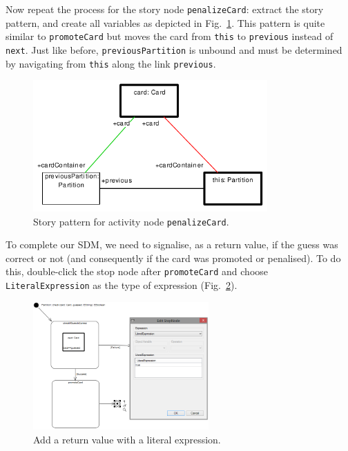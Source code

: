 Now repeat the process for the story node \texttt{penalizeCard}: extract the
story pattern, and create all variables as depicted in
Fig.~\ref{fig:sdm_check_complete_penalize}.  This pattern is quite similar to
\texttt{promoteCard} but moves the card from \texttt{this} to \texttt{previous}
instead of \texttt{next}.  Just like before, \texttt{previousPartition} is
unbound and must be determined by navigating from \texttt{this} along the link
\texttt{previous}.

\begin{figure}[htbp]
\begin{center}
  \includegraphics[width=0.8\textwidth]{pics/sdmBilder/check/sdm38}
  \caption{Story pattern for activity node \texttt{penalizeCard}.}
  \label{fig:sdm_check_complete_penalize}
\end{center}
\end{figure}

To complete our SDM, we need to signalise, as a return value, if the guess was
correct or not (and consequently if the card was promoted or penalised).  To do
this, double-click the stop node after \texttt{promoteCard} and choose
\texttt{LiteralExpression} as the type of expression
(Fig.~\ref{fig:sdm_check_literal_exp}).

\begin{figure}[htbp]
\begin{center}
  \includegraphics[width=0.6\textwidth]{pics/sdmBilder/check/sdm39}
  \caption{Add a return value with a literal expression.}
  \label{fig:sdm_check_literal_exp}
\end{center}
\end{figure}

